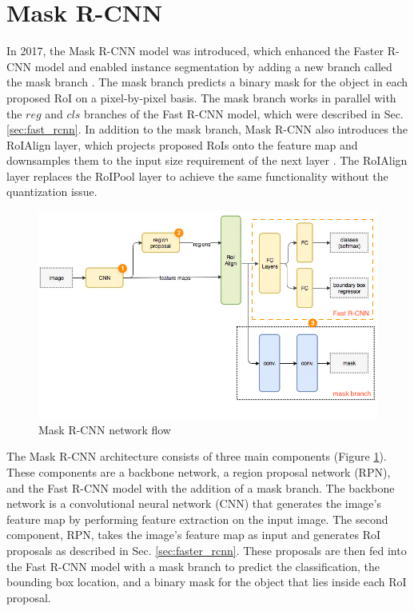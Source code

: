\section{Mask R-CNN} \label{sec:mask_rcnn}

In 2017, the Mask R-CNN model was introduced, which enhanced the Faster R-CNN model and enabled instance segmentation by adding a new branch called the mask branch \cite{mask_rcnn_2017}. The mask branch predicts a binary mask for the object in each proposed RoI on a pixel-by-pixel basis. The mask branch works in parallel with the $reg$ and $cls$ branches of the Fast R-CNN model, which were described in Sec. \ref{sec:fast_rcnn}. In addition to the mask branch, Mask R-CNN also introduces the RoIAlign layer, which projects proposed RoIs onto the feature map and downsamples them to the input size requirement of the next layer \cite{mask_rcnn_2017}. The RoIAlign layer replaces the RoIPool layer to achieve the same functionality without the quantization issue.

\begin{figure}[!ht]
    \centering
    \includegraphics[width=5in]{figures/mask_rcnn_flowc.png}
    \caption{Mask R-CNN network flow \cite{rcnn_vari_flow_chart}} \label{fig:mask_rcnn_flowc}
\end{figure}

The Mask R-CNN architecture consists of three main components (Figure \ref{fig:mask_rcnn_flowc}). These components are a backbone network, a region proposal network (RPN), and the Fast R-CNN model with the addition of a mask branch. The backbone network is a convolutional neural network (CNN) that generates the image's feature map by performing feature extraction on the input image. The second component, RPN, takes the image's feature map as input and generates RoI proposals as described in Sec. \ref{sec:faster_rcnn}. These proposals are then fed into the Fast R-CNN model with a mask branch to predict the classification, the bounding box location, and a binary mask for the object that lies inside each RoI proposal. 

